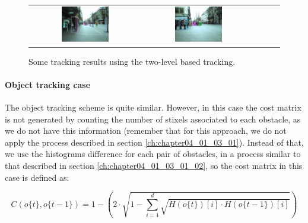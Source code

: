 \begin{figure}[h!]
    \centering
    \begin{tabular}{ ccccc}
      \includegraphics[width=0.45\textwidth]{sequenceTwoLevel/twolevel30}\label{fig:cp04_two_level_example_15} &
      \includegraphics[width=0.45\textwidth]{sequenceTwoLevel/twolevel320}\label{fig:cp04_two_level_example_126} &
    \end{tabular}
  \caption{Some tracking results using the two-level based tracking.}\label{fig:cp04_tracking_examples_two_level}
\end{figure}

\paragraph{Object tracking case}\label{ch:chapter04_01_04_02_02}

The object tracking scheme is quite similar. However, in this case the cost matrix is not generated by counting the number of stixels associated to each obstacle, as we do not have this information (remember that for this approach, we do not apply the process described in section \ref{ch:chapter04_01_03_01}). Instead of that, we use the histograms difference for each pair of obstacles, in a process similar to that described in section \ref{ch:chapter04_01_03_01_02}, so the cost matrix in this case is defined as:

\begin{equation}\label{eq:cp04_object_matching_histograms_cost}
C(o\{t\}, o\{t - 1\}) = 1 - \left ( 2 \cdot \sqrt { 1 - \underset{i=1}{\overset{d}{\sum}}\sqrt{H(o\{t\})[i] \cdot H(o\{t - 1\})[i]}} \right )
\end{equation}

